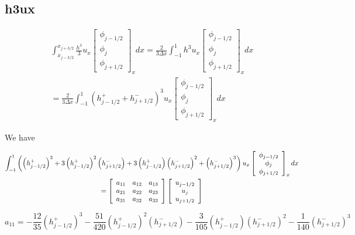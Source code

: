 \documentclass[12pt]{article}
\begin{document}
\subsection{h3ux}

\begin{multline*}
\int_{x_{j-3/2}}^{x_{j+3/2}}\frac{h^3}{3}u_{x}\left[\begin{array}{c}\phi_{j-1/2} \\\phi_{j}\\\phi_{j+1/2} \end{array}\right]_xdx = \frac{2}{3\Delta x} \int_{-1}^{1}h^3u_{x}\left[\begin{array}{c}\phi_{j-1/2} \\\phi_{j}\\\phi_{j+1/2} \end{array}\right]_xdx \\
= \frac{2}{3\Delta x} \int_{-1}^{1}\left(h^+_{j - 1/2} + h^-_{j + 1/2}\right)^3u_{x}\left[\begin{array}{c}\phi_{j-1/2} \\\phi_{j}\\\phi_{j+1/2} \end{array}\right]_xdx 
\end{multline*}

We have

\begin{multline*}
\int_{-1}^{1}\left( \left(h^+_{j - 1/2}\right)^3  +  3\left(h^+_{j - 1/2}\right)^2\left(h^-_{j + 1/2}\right) + 3 \left(h^+_{j - 1/2}\right)\left(h^-_{j + 1/2}\right)^2+  \left(h^-_{j + 1/2}\right)^3\right)u_{x}\left[\begin{array}{c}\phi_{j-1/2} \\\phi_{j}\\\phi_{j+1/2} \end{array}\right]_xdx \\=
\left[\begin{array}{c c c } 
a_{11} & a_{12}  & a_{13}\\
a_{21} & a_{22}  & a_{23}\\
a_{31} & a_{32}  & a_{33}\\
\end{array}\right] \left[\begin{array}{c}u_{j-1/2} \\u_{j}\\u_{j+1/2} \end{array}\right]
\end{multline*}

\[a_{11} = -\frac{12}{35}\left(h^+_{j - 1/2}\right)^3  - \frac{51}{420}\left(h^+_{j - 1/2}\right)^2\left(h^-_{j + 1/2}\right) - \frac{3}{105} \left(h^+_{j - 1/2}\right)\left(h^-_{j + 1/2}\right)^2 - \frac{1}{140}  \left(h^-_{j + 1/2}\right)^3 \]
\end{document}
